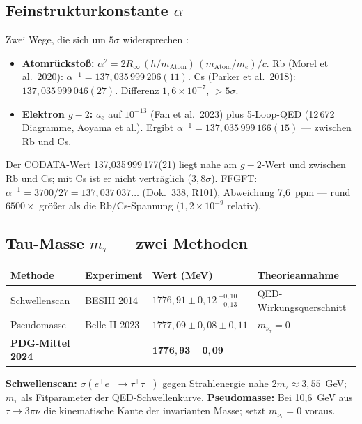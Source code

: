 \subsection{Feinstrukturkonstante $\alpha$}

Zwei Wege, die sich um $5\sigma$ widersprechen \QM:
\begin{itemize}\itemsep2pt
\item \textbf{Atomrückstoß:} $\alpha^2=2R_\infty\,(h/m_\text{Atom})\,(m_\text{Atom}/m_e)/c$. Rb (Morel et al.\ 2020): $\alpha^{-1}=137{,}035\,999\,206(11)$. Cs (Parker et al.\ 2018): $137{,}035\,999\,046(27)$. Differenz $1{,}6\times10^{-7}$, $>5\sigma$.
\item \textbf{Elektron $g-2$:} $a_e$ auf $10^{-13}$ (Fan et al.\ 2023) plus 5-Loop-QED (12\,672 Diagramme, Aoyama et al.). Ergibt $\alpha^{-1}=137{,}035\,999\,166(15)$ --- zwischen Rb und Cs.
\end{itemize}
Der CODATA-Wert 137{,}035\,999\,177(21) liegt nahe am $g-2$-Wert und zwischen Rb und Cs; mit Cs ist er nicht verträglich ($3{,}8\sigma$). FFGFT: $\alpha^{-1}=3700/27=137{,}037\,037\ldots$ (Dok.~338, R101), Abweichung 7{,}6~ppm --- rund $6500\times$ größer als die Rb/Cs-Spannung ($1{,}2\times10^{-9}$ relativ).

\subsection{Tau-Masse $m_\tau$ --- zwei Methoden}

\begin{center}
\begin{tabular}{@{}llll@{}}
\toprule
Methode & Experiment & Wert (MeV) & Theorieannahme \\
\midrule
Schwellenscan & BESIII 2014 & $1776{,}91\pm0{,}12\,{}^{+0{,}10}_{-0{,}13}$ & QED-Wirkungsquerschnitt \\
Pseudomasse & Belle II 2023 & $1777{,}09\pm0{,}08\pm0{,}11$ & $m_{\nu_\tau}=0$ \\
\textbf{PDG-Mittel 2024} & --- & $\mathbf{1776{,}93\pm0{,}09}$ & --- \\
\bottomrule
\end{tabular}
\end{center}

\textbf{Schwellenscan:} $\sigma(e^+e^-\to\tau^+\tau^-)$ gegen Strahlenergie nahe $2m_\tau\approx3{,}55$~GeV; $m_\tau$ als Fitparameter der QED-Schwellenkurve. \textbf{Pseudomasse:} Bei 10{,}6~GeV aus $\tau\to3\pi\nu$ die kinematische Kante der invarianten Masse; setzt $m_{\nu_\tau}=0$ voraus.

